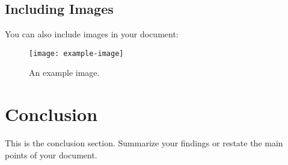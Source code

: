 \documentclass{article}
\begin{document}
\subsection{Including Images}
You can also include images in your document:

\begin{figure}[h!]
    \centering
    \texttt{[image: example-image]}
    \caption{An example image.}
    \label{fig:example}
\end{figure}

\section{Conclusion}
This is the conclusion section. Summarize your findings or restate the main points of your document.
\end{document}
